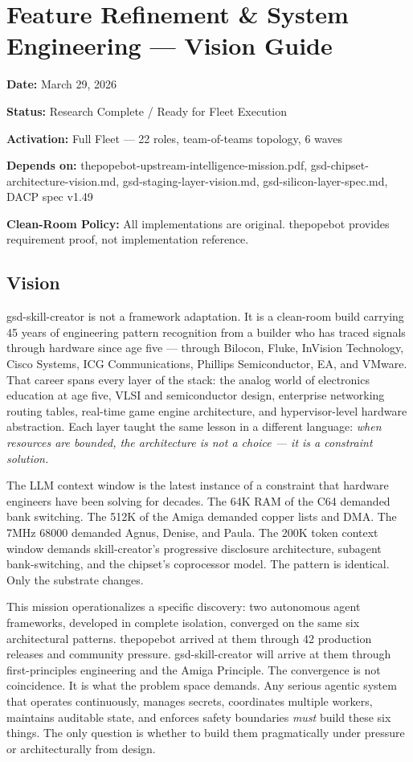 \documentclass[11pt,letterpaper]{article}
\newcommand{\metafield}[2]{\textbf{\sffamily #1} #2\par}
\begin{document}
\section{Feature Refinement \& System Engineering --- Vision Guide}

\metafield{Date:}{March 29, 2026}
\metafield{Status:}{Research Complete / Ready for Fleet Execution}
\metafield{Activation:}{Full Fleet --- 22 roles, team-of-teams topology, 6 waves}
\metafield{Depends on:}{thepopebot-upstream-intelligence-mission.pdf, gsd-chipset-architecture-vision.md, gsd-staging-layer-vision.md, gsd-silicon-layer-spec.md, DACP spec v1.49}
\metafield{Clean-Room Policy:}{All implementations are original. thepopebot provides requirement proof, not implementation reference.}

\subsection{Vision}

gsd-skill-creator is not a framework adaptation. It is a clean-room build carrying 45 years of engineering pattern recognition from a builder who has traced signals through hardware since age five --- through Bilocon, Fluke, InVision Technology, Cisco Systems, ICG Communications, Phillips Semiconductor, EA, and VMware. That career spans every layer of the stack: the analog world of electronics education at age five, VLSI and semiconductor design, enterprise networking routing tables, real-time game engine architecture, and hypervisor-level hardware abstraction. Each layer taught the same lesson in a different language: \textit{when resources are bounded, the architecture is not a choice --- it is a constraint solution.}

The LLM context window is the latest instance of a constraint that hardware engineers have been solving for decades. The 64K RAM of the C64 demanded bank switching. The 512K of the Amiga demanded copper lists and DMA. The 7MHz 68000 demanded Agnus, Denise, and Paula. The 200K token context window demands skill-creator's progressive disclosure architecture, subagent bank-switching, and the chipset's coprocessor model. The pattern is identical. Only the substrate changes.

This mission operationalizes a specific discovery: two autonomous agent frameworks, developed in complete isolation, converged on the same six architectural patterns. thepopebot arrived at them through 42 production releases and community pressure. gsd-skill-creator will arrive at them through first-principles engineering and the Amiga Principle. The convergence is not coincidence. It is what the problem space demands. Any serious agentic system that operates continuously, manages secrets, coordinates multiple workers, maintains auditable state, and enforces safety boundaries \textit{must} build these six things. The only question is whether to build them pragmatically under pressure or architecturally from design.
\end{document}

